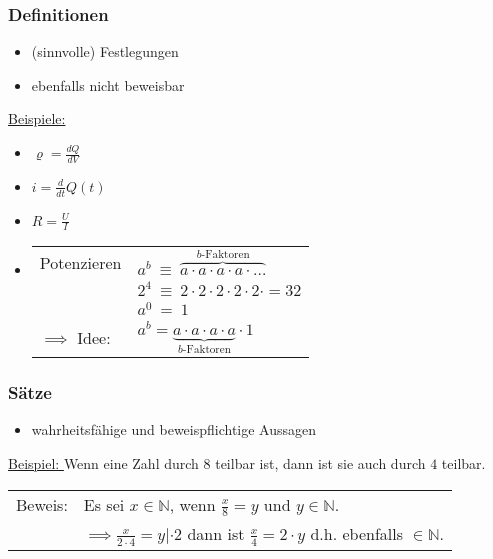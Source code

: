         \subsubsection{Definitionen}
            \begin{itemize}[leftmargin=*]
                \item (sinnvolle) Festlegungen
                \item ebenfalls nicht beweisbar
            \end{itemize}
            \underline{Beispiele:}
            \begin{itemize}[leftmargin=*]
                \item $\varrho = \frac{dQ}{dV}$
                \item $i = \frac{d}{dt} Q(t)$
                \item $R = \frac{U}{I}$
                \item   \begin{tabular}[t]{l l}
                        Potenzieren     &  $a^b  \ \equiv \ \overbrace{a \cdot a \cdot a \cdot a \cdot \ldots}^{b \text{-Faktoren}} $ \\
                                        &  $2^{4}\ \equiv \ {2 \cdot 2 \cdot 2 \cdot 2 \cdot 2 \cdot = 32}$ \\ 
                                        &  $a^0 \ = \ 1$ \\
                        $\implies$ Idee: &  $a^b = \underbrace{a \cdot a \cdot a \cdot a}_{b \text{-Faktoren}} \cdot 1$ \\  
                        \end{tabular}
            \end{itemize}
        \subsubsection{Sätze}
            \begin{itemize}[leftmargin=*]
                \item wahrheitsfähige und beweispflichtige Aussagen
            \end{itemize}
            \underline{Beispiel: } Wenn eine Zahl durch $8$ teilbar ist, dann ist sie auch durch $4$ teilbar. 

            \begin{tabular}{@{}l l}
                Beweis: & Es sei $x\in\mathbb{N}$, wenn $\frac{x}{8} = y$ und $y\in\mathbb{N}$. \\
                & $\implies \frac{x}{2 \cdot 4} = y | \cdot 2$ dann ist $\frac{x}{4} = 2 \cdot y$ d.h. ebenfalls $\in\mathbb{N}$. \\
            \end{tabular}

